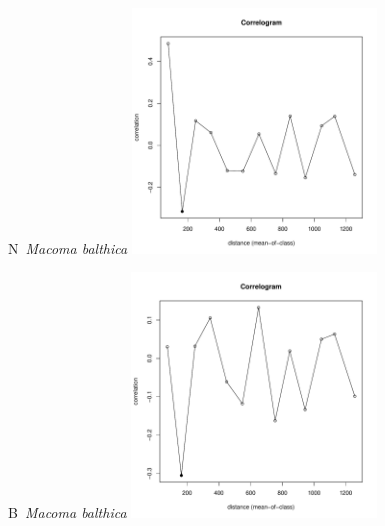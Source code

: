 \documentclass[12pt, a4paper]{disser}
\begin{document}
	\begin{figure}[h]

	\begin{minipage}[b]{.46\linewidth}
	\begin{center}
	{\small N~{\it Macoma balthica}}
		\includegraphics[width=65mm]{../Barenc_Sea/distribution_Moran/Plyazh081_moran_N_Macoma_balthica_.pdf}
	\end{center}
	\end{minipage}
%
	\hfil %
%
	\begin{minipage}[b]{.46\linewidth}
	\begin{center}
	{\small B~{\it Macoma balthica}}
		\includegraphics[width=65mm]{../Barenc_Sea/distribution_Moran/Plyazh081_moran_B_Macoma_balthica_.pdf}
	\end{center}
	\end{minipage}


\end{figure}
\end{document}
